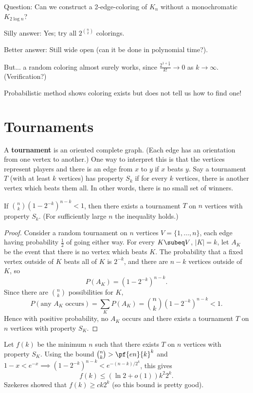 Question: Can we construct a 2-edge-coloring of $K_n$ without a monochromatic $K_{2\log n}$?

Silly answer: Yes; try all $2^{\binom n2}$ colorings.

Better answer: Still wide open (can it be done in polynomial time?).

But... a random coloring almost surely works, since $\frac{2^{1+\frac k2}}{k!}\to 0$ as $k\to \infty$. (Verification?)

Probabilistic method shows coloring exists but does not tell us how to find one!

\section{Tournaments}
\begin{df}
A \textbf{tournament} is an oriented complete graph. (Each edge has an orientation from one vertex to another.) One way to interpret this is that the vertices represent players and there is an edge from $x$ to $y$ if $x$ beats $y$. 
Say a tournament $T$ (with at least $k$ vertices) has property $S_k$ if for every $k$ vertices, there is another vertex which beats them all. In other words, there is no small set of winners.
\end{df}
\begin{thm}[Erd\"os] If $\binom nk (1-2^{-k})^{n-k}<1$, then there exists a tournament $T$ on $n$ vertices with property $S_k$. (For sufficiently large $n$ the inequality holds.)
\end{thm}
\begin{proof}
Consider a random tournament on $n$ vertices $V=\{1,\ldots, n\}$, each edge having probability $\frac 12$ of going either way.  For every $K\subeq V$, $|K|=k$, let $A_K$ be the event that there is no vertex which beats $K$.
The probability that a fixed vertex outside of $K$ beats all of $K$ is $2^{-k}$, and there are $n-k$ vertices outside of $K$, so
\[P(A_K)=(1-2^{-k})^{n-k}.\]
Since there are $\binom nk$ possibilities for $K$,
\[P(\text{any }A_K \text{ occurs})=\sum_K P(A_K)=\binom nk(1-2^{-k})^{n-k}<1.\]
Hence with positive probability, no $A_K$ occurs and there exists a tournament $T$ on $n$ vertices with property $S_K$. 
\end{proof}
Let $f(k)$ be the minimum $n$ such that there exists $T$ on $n$ vertices with property $S_K$. Using the bound $\binom nk>\pf{en}{k}^k$ and $1-x<e^{-x}\implies (1-2^{-k})^{n-k}<e^{-(n-k)/2^k}$, this gives
\[f(k)\leq (\ln 2+o(1))k^2 2^k.\]
Szekeres showed that $f(k)\geq ck2^k$ (so this bound is pretty good).

